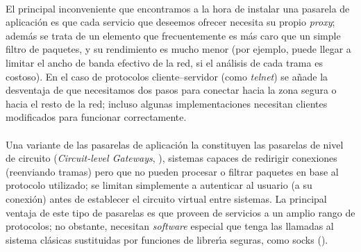 \\El principal inconveniente que encontramos a la hora de instalar una pasarela
de aplicaci\'on es que cada servicio que deseemos ofrecer necesita su propio
{\it proxy}; adem\'as se trata de un elemento que frecuentemente es m\'as caro
que un simple filtro de paquetes, y su rendimiento es mucho menor (por ejemplo,
puede llegar a limitar el ancho de banda efectivo de la red, si el an\'alisis
de cada trama es costoso). En el caso de protocolos cliente--servidor (como
{\it telnet}) se a\~nade la desventaja de que necesitamos dos pasos para 
conectar hacia la zona segura o hacia el resto de la red; incluso algunas 
implementaciones necesitan clientes modificados para funcionar correctamente.\\
\\Una variante de las pasarelas de aplicaci\'on la constituyen las pasarelas de
nivel de circuito ({\it Circuit-level Gateways}, \cite{kn:che94}), sistemas
capaces de redirigir conexiones (reenviando tramas) pero que no pueden procesar
o filtrar paquetes en base al protocolo utilizado; se limitan simplemente a 
autenticar al usuario (a su conexi\'on) antes de establecer el circuito virtual 
entre sistemas. La principal ventaja de este tipo de pasarelas es que proveen 
de servicios a un amplio
rango de protocolos; no obstante, necesitan {\it software} especial que tenga
las llamadas al sistema cl\'asicas sustituidas por funciones de librer\'{\i}a
seguras, como {\sc socks} (\cite{kn:kob92}).
